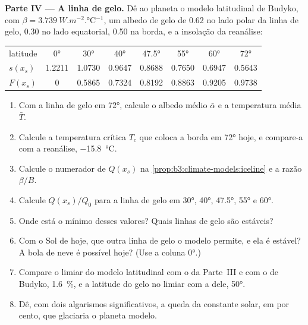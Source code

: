\begin{problem}
\medskip\noindent\textbf{Parte IV --- A linha de gelo.} Dê ao planeta
o modelo latitudinal de Budyko, com $\beta = \qty{3.739}{W.m^{-2}.\celsius^{-1}}$,
um albedo de gelo de 0.62 no lado polar da linha de gelo, 0.30 no lado equatorial, 0.50 na
borda, e a insolação da reanálise:
\begin{center}
\begin{tabular}{lccccccc}
\hline
latitude & \ang{0} & \ang{30} & \ang{40} & \ang{47.5} & \ang{55} & \ang{60} & \ang{72}\\
$s(x_s)$ & 1.2211 & 1.0730 & 0.9647 & 0.8688 & 0.7650 & 0.6947 & 0.5643\\
$F(x_s)$ & 0 & 0.5865 & 0.7324 & 0.8192 & 0.8863 & 0.9205 & 0.9738\\
\hline
\end{tabular}
\end{center}
\begin{enumerate}[resume]
\item Com a linha de gelo em \ang{72}, calcule o albedo médio $\bar\alpha$
  e a temperatura média $\bar T$.
\item Calcule a temperatura crítica $T_c$ que coloca a borda em
  \ang{72} hoje, e compare-a com a reanálise, \qty{-15.8}{\celsius}.
\item Calcule o numerador de $Q(x_s)$ na \cref{prop:b3:climate-models:iceline}
  e a razão $\beta/B$.
\item Calcule $Q(x_s)/Q_0$ para a linha de gelo em \ang{30}, \ang{40},
  \ang{47.5}, \ang{55} e \ang{60}.
\item Onde está o mínimo desses valores? Quais linhas de gelo são estáveis?
\item Com o Sol de hoje, que outra linha de gelo o modelo permite, e ela é
  estável? A bola de neve é possível hoje? (Use a coluna \ang{0}.)
\item Compare o limiar do modelo latitudinal com o da Parte~III
  e com o de Budyko, \qty{1.6}{\percent}, e a latitude do gelo no
  limiar com a dele, \ang{50}.
\item Dê, com dois algarismos significativos, a queda da constante solar, em
  por cento, que glaciaria o planeta modelo.
\end{enumerate}
\end{problem}
